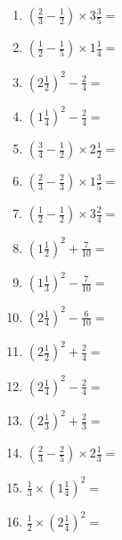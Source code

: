 \documentclass[12pt]{article}
\begin{document}
\begin{enumerate}
\item \large $ \left( \frac{2}{3} - \frac{1}{2} \right) \times 3 \frac{3}{5} = $ \vspace{1.6cm}
\item \large $ \left( \frac{1}{2} - \frac{1}{5} \right) \times 1 \frac{1}{4} = $ \vspace{1.6cm}
\item \large $ \left( 2 \frac{1}{2} \right)^2 - \frac{2}{4} = $ \vspace{1.6cm}
\item \large $ \left( 1 \frac{1}{4} \right)^2 - \frac{2}{4} = $ \vspace{1.6cm}
\item \large $ \left( \frac{3}{4} - \frac{1}{2} \right) \times 2 \frac{1}{2} = $ \vspace{1.6cm}
\newpage
\item \large $ \left( \frac{2}{3} - \frac{2}{3} \right) \times 1 \frac{3}{5} = $ \vspace{1.6cm}
\item \large $ \left( \frac{1}{2} - \frac{1}{2} \right) \times 3 \frac{2}{4} = $ \vspace{1.6cm}
\item \large $ \left( 1 \frac{1}{2} \right)^2 + \frac{7}{10} = $ \vspace{1.6cm}
\item \large $ \left( 1 \frac{1}{3} \right)^2 - \frac{7}{10} = $ \vspace{1.6cm}
\item \large $ \left( 2 \frac{1}{4} \right)^2 - \frac{6}{10} = $ \vspace{1.6cm}
\item \large $ \left( 2 \frac{1}{2} \right)^2 + \frac{2}{4} = $ \vspace{1.6cm}
\item \large $ \left( 2 \frac{1}{4} \right)^2 - \frac{2}{4} = $ \vspace{1.6cm}
\item \large $ \left( 2 \frac{1}{3} \right)^2 + \frac{2}{3} = $ \vspace{1.6cm}
\item \large $ \left( \frac{2}{3} - \frac{2}{5} \right) \times 2 \frac{1}{3} = $ \vspace{1.6cm}
\item \large $ \frac{1}{3} \times \left( 1 \frac{1}{4} \right)^2 = $ \vspace{1.6cm}
\newpage
\item \large $ \frac{1}{2} \times \left( 2 \frac{1}{4} \right)^2 = $ \vspace{1.6cm}

\end{enumerate}
\end{document}
